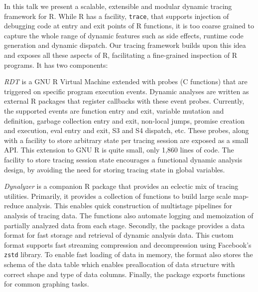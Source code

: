 \documentclass[acmsmall,review]{acmart}
\newcommand{\code}[1]{\lstinline|#1|\xspace}
\begin{document}
In this talk we present a scalable, extensible and modular dynamic tracing
framework for R. While R has a facility, \code{trace}, that supports injection
of debugging code at entry and exit points of R functions, it is too coarse
grained to capture the whole range of dynamic features such as side effects,
runtime code generation and dynamic dispatch. Our tracing framework builds upon
this idea and exposes all these aspects of R, facilitating a fine-grained
inspection of R programs. It has two components:
\begin{compactitem}[$-$]
\item \emph{RDT} is a GNU R Virtual Machine extended with probes (C functions)
  that are triggered on specific program execution events. Dynamic analyses are
  written as external R packages that register callbacks with these event probes.
  Currently, the supported events are function entry and exit, variable mutation
  and definition, garbage collection entry and exit, non-local jumps, promise
  creation and execution, eval entry and exit, S3 and S4 dispatch, etc. These
  probes, along with a facility to store arbitrary state per tracing session are
  exposed as a small API. This extension to GNU R is quite small,
  only 1,860 lines of code. The facility to store tracing session state
  encourages a functional dynamic analysis design, by avoiding the need for
  storing tracing state in global variables.

\item \emph{Dynalyzer} is a companion R package that provides an eclectic mix of
  tracing utilities. Primarily, it provides a collection of functions to build
  large scale map-reduce analysis. This enables quick construction of multistage
  pipelines for analysis of tracing data. The functions also automate logging and
  memoization of partially analyzed data from each stage. Secondly, the package
  provides a data format for fast storage and retrieval of dynamic analysis data.
  This custom format supports fast streaming compression and decompression using
  Facebook's \code{zstd} library. To enable fast loading of data in memory, the
  format also stores the schema of the data table which enables preallocation of
  data structure with correct shape and type of data columns. Finally, the package
  exports functions for common graphing tasks.

\end{compactitem}
\end{document}
